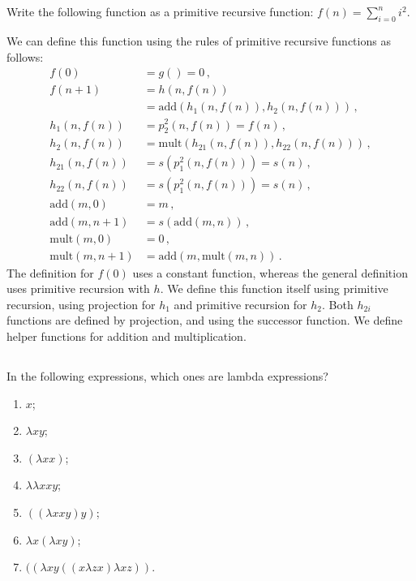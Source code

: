 \subsection{} %
Write the following function as a primitive recursive function:
\(f(n) = \sum_{i=0}^n i^2\).

\begin{solution}
	We can define this function using the rules
	of primitive recursive functions as follows:
	\begin{align*}
		f(0) &= g() = 0\,,\\
		f(n+1) &= h(n, f(n))\\
		&= \mathrm{add}(h_1(n, f(n)), h_2(n, f(n)))\,,\\
		h_1(n, f(n)) &= p_2^2(n, f(n)) = f(n)\,,\\
		h_2(n, f(n)) &= \mathrm{mult}(h_{21}(n, f(n)), h_{22}(n, f(n)))\,,\\
		h_{21}(n, f(n)) &= s(p_1^2(n, f(n))) = s(n)\,,\\
		h_{22}(n, f(n)) &= s(p_1^2(n, f(n))) = s(n)\,,\\
		\mathrm{add}(m, 0) &= m\,,\\
		\mathrm{add}(m, n+1) &= s(\mathrm{add}(m, n))\,,\\
		\mathrm{mult}(m, 0) &= 0\,,\\
		\mathrm{mult}(m, n+1) &= \mathrm{add}(m, \mathrm{mult}(m, n))\,.
	\end{align*}
	The definition for \(f(0)\) uses a constant function,
	whereas the general definition uses primitive recursion with \(h\).
	We define this function itself using primitive recursion,
	using projection for \(h_1\) and primitive recursion for \(h_2\).
	Both \(h_{2i}\) functions are defined by projection,
	and using the successor function.
	We define helper functions for addition and multiplication.
\end{solution}

\subsection{} %
In the following expressions, which ones are lambda expressions?
\begin{multicols}{2}
\begin{enumerate}
	\item \(x\);
	\item \(\lambda x y\);
	\item \((\lambda xx)\);
	\item \(\lambda \lambda xxy\);
	\item \(((\lambda xxy)y)\);
	\item \(\lambda x (\lambda x y)\);
	\item \(((\lambda x y ((x \lambda z x) \lambda x z))\).
\end{enumerate}
\end{multicols}

